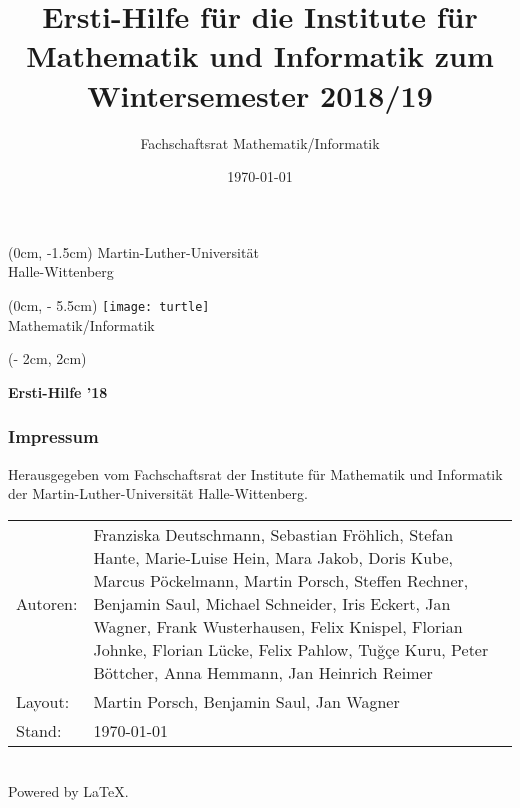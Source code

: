 \thispagestyle{empty}

\title{Ersti-Hilfe für die Institute für 
    Mathematik und Informatik zum
    Wintersemester 2018/19}
\author{Fachschaftsrat Mathematik/Informatik}
\date{\today}

{
    \sffamily
    \begin{textblock*}{\linewidth}(0cm, -1.5cm)
        \fontsize{1cm}{1cm}\selectfont
        Martin-Luther-Universität \\
        Halle-Wittenberg
    \end{textblock*}
    \begin{textblock*}{\linewidth}(0cm, \textheight - 5.5cm)
        \fontsize{0.925cm}{0.925cm}\selectfont
        \texttt{[image: turtle]} \\
        Mathematik/Informatik
    \end{textblock*}
    \begin{textblock*}{2cm}(\linewidth - 2cm, 2cm)
        \begin{sideways}
            \fontsize{2.5cm}{2.5cm}\selectfont
            \bfseries
            Ersti-Hilfe ’18
        \end{sideways}
    \end{textblock*}
}

\newpage
\thispagestyle{empty}
\subsubsection{Impressum}
Herausgegeben vom Fachschaftsrat der Institute für Mathematik und Informatik der
Martin-Luther-Universität Halle-Wittenberg.\\[1.0em]
\begin{tabularx}{\textwidth}{@{}lX@{}}
 Autoren: & Franziska Deutschmann,                                              %
            Sebastian Fröhlich,
            Stefan Hante,
            Marie-Luise Hein,
            Mara Jakob,
            Doris Kube,
            Marcus Pöckelmann,
            Martin Porsch,
            Steffen Rechner,
            Benjamin Saul,
            Michael Schneider,
            Iris Eckert,
            Jan Wagner,
            Frank Wusterhausen,
            Felix Knispel,
            Florian Johnke,
            Florian Lücke,
            Felix Pahlow,
            Tuğçe Kuru,
            Peter Böttcher,
            Anna Hemmann,
            Jan Heinrich Reimer\\
 Layout:  & Martin Porsch, Benjamin Saul, Jan Wagner\\
 Stand:   & \today\\
\end{tabularx}\\[1.0em]
Powered by \LaTeX.
\pagebreak

